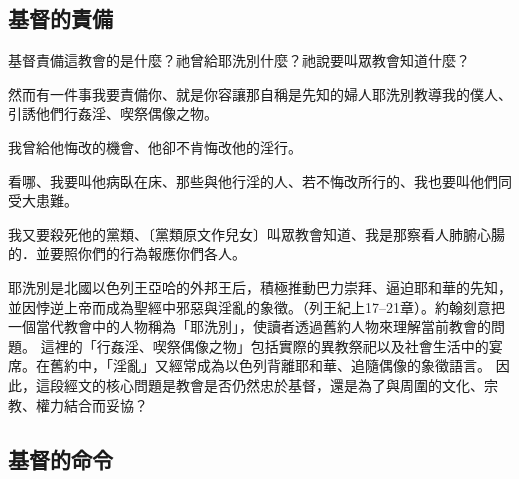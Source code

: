 \subsection{基督的責備}

\begin{ScriptureBox2}{基督責備這教會的是什麼？祂曾給耶洗別什麼？祂說要叫眾教會知道什麼？}

\item[2:20] 然而有一件事我要責備你、就是你容讓那自稱是先知的婦人耶洗別教導我的僕人、引誘他們行姦淫、喫祭偶像之物。

\item[2:21] 我曾給他悔改的機會、他卻不肯悔改他的淫行。

\item[2:22] 看哪、我要叫他病臥在床、那些與他行淫的人、若不悔改所行的、我也要叫他們同受大患難。

\item[2:23] 我又要殺死他的黨類、〔黨類原文作兒女〕叫眾教會知道、我是那察看人肺腑心腸的．並要照你們的行為報應你們各人。

\end{ScriptureBox2}

耶洗別是北國以色列王亞哈的外邦王后，積極推動巴力崇拜、逼迫耶和華的先知，並因悖逆上帝而成為聖經中邪惡與淫亂的象徵。（列王紀上17–21章）。約翰刻意把一個當代教會中的人物稱為「耶洗別」，使讀者透過舊約人物來理解當前教會的問題。
這裡的「行姦淫、喫祭偶像之物」包括實際的異教祭祀以及社會生活中的宴席。在舊約中，「淫亂」又經常成為以色列背離耶和華、追隨偶像的象徵語言。
因此，這段經文的核心問題是教會是否仍然忠於基督，還是為了與周圍的文化、宗教、權力結合而妥協？

\subsection{基督的命令}

